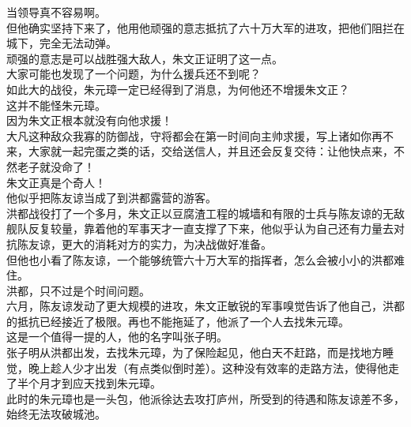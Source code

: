 \begin{multicols}{\theparacolNo}
当领导真不容易啊。\\

但他确实坚持下来了，他用他顽强的意志抵抗了六十万大军的进攻，把他们阻拦在城下，完全无法动弹。\\

顽强的意志是可以战胜强大敌人，朱文正证明了这一点。\\

大家可能也发现了一个问题，为什么援兵还不到呢？\\

如此大的战役，朱元璋一定已经得到了消息，为何他还不增援朱文正？\\

这并不能怪朱元璋。\\

因为朱文正根本就没有向他求援！\\

大凡这种敌众我寡的防御战，守将都会在第一时间向主帅求援，写上诸如你再不来，大家就一起完蛋之类的话，交给送信人，并且还会反复交待：让他快点来，不然老子就没命了！\\

朱文正真是个奇人！\\

他似乎把陈友谅当成了到洪都露营的游客。\\

洪都战役打了一个多月，朱文正以豆腐渣工程的城墙和有限的士兵与陈友谅的无敌舰队反复较量，靠着他的军事天才一直支撑了下来，他似乎认为自己还有力量去对抗陈友谅，更大的消耗对方的实力，为决战做好准备。\\

但他也小看了陈友谅，一个能够统管六十万大军的指挥者，怎么会被小小的洪都难住。\\

洪都，只不过是个时间问题。\\

六月，陈友谅发动了更大规模的进攻，朱文正敏锐的军事嗅觉告诉了他自己，洪都的抵抗已经接近了极限。再也不能拖延了，他派了一个人去找朱元璋。\\

这是一个值得一提的人，他的名字叫张子明。\\

张子明从洪都出发，去找朱元璋，为了保险起见，他白天不赶路，而是找地方睡觉，晚上趁人少才出发（有点类似倒时差）。这种没有效率的走路方法，使得他走了半个月才到应天找到朱元璋。\\

此时的朱元璋也是一头包，他派徐达去攻打庐州，所受到的待遇和陈友谅差不多，始终无法攻破城池。\\


\end{multicols}
